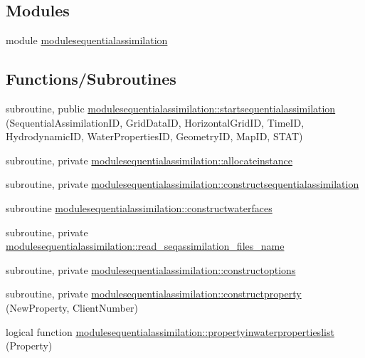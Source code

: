 \subsection*{Modules}
\begin{DoxyCompactItemize}
\item 
module \mbox{\hyperlink{namespacemodulesequentialassimilation}{modulesequentialassimilation}}
\end{DoxyCompactItemize}
\subsection*{Functions/\+Subroutines}
\begin{DoxyCompactItemize}
\item 
subroutine, public \mbox{\hyperlink{namespacemodulesequentialassimilation_af7b9f893222a8a590e41b22e1cbb87e8}{modulesequentialassimilation\+::startsequentialassimilation}} (Sequential\+Assimilation\+ID, Grid\+Data\+ID, Horizontal\+Grid\+ID, Time\+ID, Hydrodynamic\+ID, Water\+Properties\+ID, Geometry\+ID, Map\+ID, S\+T\+AT)
\item 
subroutine, private \mbox{\hyperlink{namespacemodulesequentialassimilation_aa0f41510375f375c75e2f8a43000247e}{modulesequentialassimilation\+::allocateinstance}}
\item 
subroutine, private \mbox{\hyperlink{namespacemodulesequentialassimilation_a3da335c8c675b830ec8be82762a0bb61}{modulesequentialassimilation\+::constructsequentialassimilation}}
\item 
subroutine \mbox{\hyperlink{namespacemodulesequentialassimilation_a6a108acb64c98821e2a33f354767a9c1}{modulesequentialassimilation\+::constructwaterfaces}}
\item 
subroutine, private \mbox{\hyperlink{namespacemodulesequentialassimilation_ad625646f49c7f79a25eece8ee6fc763c}{modulesequentialassimilation\+::read\+\_\+seqassimilation\+\_\+files\+\_\+name}}
\item 
subroutine, private \mbox{\hyperlink{namespacemodulesequentialassimilation_aab4ab0277115cb693a57157090d95c51}{modulesequentialassimilation\+::constructoptions}}
\item 
subroutine, private \mbox{\hyperlink{namespacemodulesequentialassimilation_a37aa5f00e0026d3fb403e9d6fd041de3}{modulesequentialassimilation\+::constructproperty}} (New\+Property, Client\+Number)
\item 
logical function \mbox{\hyperlink{namespacemodulesequentialassimilation_a8c49e08db24e999a05be06bf048eeb25}{modulesequentialassimilation\+::propertyinwaterpropertieslist}} (Property)

\end{DoxyCompactItemize}
